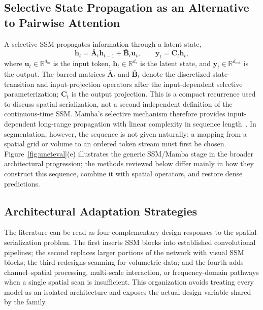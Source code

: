 \documentclass[5p,times,authoryear]{elsarticle}
\begin{document}
\subsection{Selective State Propagation as an Alternative to Pairwise Attention}

A selective SSM propagates information through a latent state,
\begin{equation}
\mathbf{h}_t=\bar{\mathbf{A}}_t\mathbf{h}_{t-1}+\bar{\mathbf{B}}_t\mathbf{u}_t,
\qquad
\mathbf{y}_t=\mathbf{C}_t\mathbf{h}_t,
\label{eq:mamba_recurrence}
\end{equation}
where $\mathbf{u}_t\in\mathbb{R}^{d_{\mathrm{in}}}$ is the input token, $\mathbf{h}_t\in\mathbb{R}^{d_s}$ is the latent state, and $\mathbf{y}_t\in\mathbb{R}^{d_{\mathrm{out}}}$ is the output. The barred matrices $\bar{\mathbf{A}}_t$ and $\bar{\mathbf{B}}_t$ denote the discretized state-transition and input-projection operators after the input-dependent selective parameterization; $\mathbf{C}_t$ is the output projection. This is a compact recurrence used to discuss spatial serialization, not a second independent definition of the continuous-time SSM. Mamba's selective mechanism therefore provides input-dependent long-range propagation with linear complexity in sequence length~\citep{gu2023mamba}. In segmentation, however, the sequence is not given naturally: a mapping from a spatial grid or volume to an ordered token stream must first be chosen. Figure~\ref{fig:uneteval}(e) illustrates the generic SSM/Mamba stage in the broader architectural progression; the methods reviewed below differ mainly in how they construct this sequence, combine it with spatial operators, and restore dense predictions.

\subsection{Architectural Adaptation Strategies}

The literature can be read as four complementary design responses to the spatial-serialization problem. The first inserts SSM blocks into established convolutional pipelines; the second replaces larger portions of the network with visual SSM blocks; the third redesigns scanning for volumetric data; and the fourth adds channel--spatial processing, multi-scale interaction, or frequency-domain pathways when a single spatial scan is insufficient. This organization avoids treating every model as an isolated architecture and exposes the actual design variable shared by the family.
\end{document}

